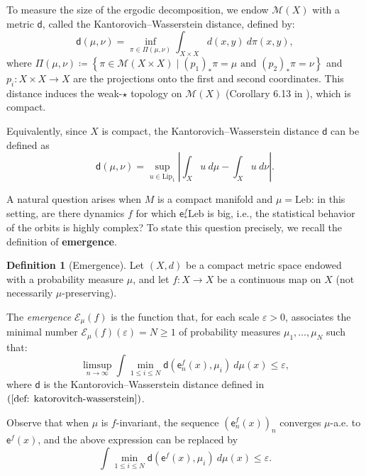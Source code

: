 \documentclass[11pt,reqno]{amsart}
\theoremstyle{plain}
\theoremstyle{definition}
\newtheorem{definition}[theorem]{Definition}
\theoremstyle{remark}
\theoremstyle{plain}
\numberwithin{equation}{section}
\newcommand{\eps}{\varepsilon}
\begin{document}
To measure the size of the ergodic decomposition, we endow $\mathcal{M}(X)$ with a metric $\mathsf{d}$, called the Kantorovich--Wasserstein distance, defined by: \begin{equation} \label{def: katorovitch-wasserstein} \mathsf{d}(\mu,\nu)=\inf_{\pi \in \Pi(\mu,\nu)}\int_{X\times X} d(x,y) \ d\pi(x,y),\end{equation} where $\Pi(\mu,\nu)\coloneqq \left\{\pi \in \mathcal{M}(X\times X) \mid (p_{1})_{\ast}\pi=\mu \text{ and }(p_{2})_{\ast}\pi=\nu\right\}$ and $p_{i}\colon X\times X \to X$ are the projections onto the first and second coordinates. This distance induces the weak-$\star$ topology on $\mathcal{M}(X)$ (Corollary 6.13 in \cite{villani2009optimal}), which is compact. 

Equivalently, since $X$ is compact, the Kantorovich--Wasserstein distance $\mathsf{d}$ can be defined as \begin{equation} \label{def: katorovitch-wasserstein 2} \mathsf{d}(\mu,\nu)=\sup_{u\in \mathrm{Lip}_{1}} \left| \int_{X} u \ d\mu - \int_{X} u \ d\nu \right|.\end{equation}

A natural question arises when $M$ is a compact manifold and $\mu=\mathrm{Leb}$: in this setting, are there dynamics $f$ for which $\mathsf{e}^{f}_{\ast}\mathrm{Leb}$ is big, i.e., the statistical behavior of the orbits is highly complex? To state this question precisely, we recall the definition of \textbf{emergence}.

\begin{definition}[Emergence]\label{def: metric emergence}
	Let $(X,d)$ be a compact metric space endowed with a probability measure $\mu$, and let $f\colon X \to X$ be a continuous map on $X$ (not necessarily $\mu$-preserving). 
	
	The \textit{emergence} $\mathcal{E}_{\mu}(f)$ is the function that, for each scale $\eps>0$, associates the minimal number $\mathcal{E}_{\mu}(f)(\eps)=N\geq 1$ of probability measures $\mu_{1},\dots,\mu_{N}$ such that: $$\limsup_{n\to \infty}{\int \min_{1\leq i\leq N}{\mathsf{d}(\mathsf{e}_{n}^{f}(x),\mu_{i})} \ d\mu(x)}\leq \eps,$$ where $\mathsf{d}$ is the Kantorovich--Wasserstein distance defined in $(\ref{def: katorovitch-wasserstein})$. 
\end{definition}

Observe that when $\mu$ is $f$-invariant, the sequence $(\mathsf{e}_{n}^{f}(x))_{n}$ converges $\mu$-a.e. to $\mathsf{e}^{f}(x)$, and the above expression can be replaced by $$\int \min_{1\leq i\leq N}{\mathsf{d}(\mathsf{e}^{f}(x),\mu_{i})} \ d\mu(x)\leq \eps.$$
\end{document}

